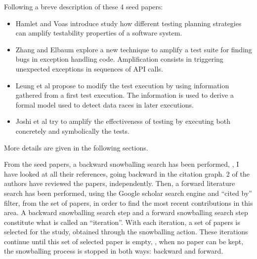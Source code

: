 Following a breve description of these 4 seed papers:
\begin{itemize}
	\item \cite{HamletV93} Hamlet and Voas introduce study how different testing planning strategies can amplify testability properties of a software system.
	\item \cite{zhang2012} Zhang and Elbaum explore a new technique to amplify a test suite for finding bugs in exception handling code. Amplification consists in triggering unexpected exceptions in sequences of API calls.
	\item \cite{leung12} Leung et al propose to modify the test execution by using information gathered from a first test execution. The information is used to derive a formal model used to detect data races in later executions.
	\item \cite{Joshi07} Joshi et al  try to amplify the effectiveness of testing by executing both concretely and symbolically the tests.
\end{itemize}
More details are given in the following sections.

From the seed papers, a backward snowballing search  \cite{jalali2012systematic} has been performed, \ie, I have looked at all their references, going backward in the citation graph. 
2 of the authors have reviewed the papers, independently. 
Then, a forward literature search  has been performed, using the Google scholar search engine and ``cited by'' filter, from the set of papers, in order to find the most recent contributions in this area.
A backward snowballing search step and a forward snowballing search step constitute what is called an ``iteration''.
With each iteration, a set of papers is selected for the study, obtained through the snowballing action.
These iterations continue until this set of selected paper is empty, \ie, when no paper can be kept, the snowballing process is stopped in both ways: backward and forward.

